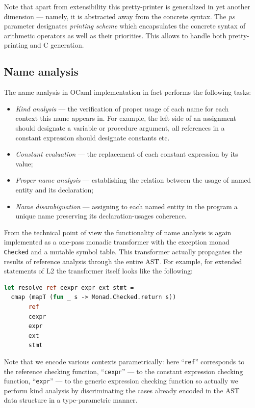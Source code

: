 Note that apart from extensibility this pretty-printer is generalized in yet another 
dimension --- namely, it is abstracted away from the concrete syntax. The \emph{ps}
parameter designates \emph{printing scheme} which encapsulates the concrete
syntax of arithmetic operators as well as their priorities. This allows to handle
both pretty-printing and C generation.

\subsection{Name analysis}

The name analysis in OCaml implementation in fact performs the following tasks:

\begin{itemize}
\item \emph{Kind analysis} --- the verification of proper usage of each name for each context this
name appears in. For example, the left side of an assignment should designate a variable or procedure argument,
all references in a constant expression should designate constants etc.
\item \emph{Constant evaluation} --- the replacement of each constant expression by
its value;
\item \emph{Proper name analysis} --- establishing the relation between the usage of
named entity and its declaration;
\item \emph{Name disambiguation} --- assigning to each named entity in the program a unique
name preserving its declaration-usages coherence.
\end{itemize}

From the technical point of view the functionality of name analysis is again implemented as a 
one-pass monadic transformer with the exception monad \lstinline{Checked} and a mutable symbol 
table. This transformer actually propagates the results of reference analysis through the 
entire AST. For example, for extended statements of L2 the transformer itself looks like
the following:

\begin{lstlisting}[language=ocaml]
let resolve ref cexpr expr ext stmt =
  cmap (mapT (fun _ s -> Monad.Checked.return s)) 
       ref 
       cexpr 
       expr 
       ext        
       stmt
\end{lstlisting}

Note that we encode various contexts parametrically: here ``\lstinline{ref}'' corresponds
to the reference checking function, ``\lstinline{cexpr}'' --- to the constant expression 
checking function, ``\lstinline{expr}'' --- to the generic expression checking function
so actually we perform kind analysis by discriminating the cases already encoded in
the AST data structure in a type-parametric manner. 

